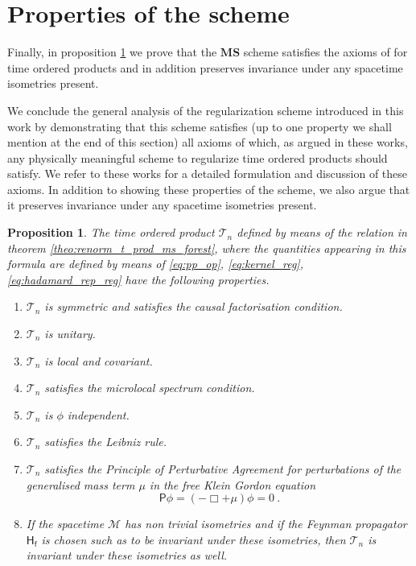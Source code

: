\documentclass[11pt]{book}
\newcommand{\com}[1]{{\color{red}\bf #1}}
\newcommand{\MS}{\textbf{MS}}
\newcommand{\Mcal}{\mathcal{M}}
\newcommand{\Tcal}{\mathcal{T}}
\newcommand{\Hsf}{\mathsf{H}}
\newcommand{\Psf}{\mathsf{P}}
\newcommand{\fsf}{\mathsf{f}}
\theoremstyle{break}
\newtheorem{proposition}{Proposition}[chapter]
\begin{document}
\com{
\section{Properties of the scheme}

Finally, in proposition \ref{prop:properties_scheme} we prove that the $\MS$ scheme satisfies the axioms of \cite{hollands_local_2001,hollands_existence_2002} for time ordered products and in addition preserves invariance under any spacetime isometries present.

We conclude the general analysis of the regularization scheme introduced in this work by demonstrating that this scheme satisfies (up to one property we shall mention at the end of this section) all axioms of \cite{hollands_local_2001,hollands_existence_2002,hollands_conservation_2005} which, as argued in these works, any physically meaningful scheme to regularize time ordered products should satisfy. We refer to these works for a detailed formulation and discussion of these axioms. In addition to showing these properties of the scheme, we also argue that it preserves invariance under any spacetime isometries present.


\begin{proposition}\label{prop:properties_scheme} 
The time ordered product $\Tcal_n$ defined by means of the relation in theorem \ref{theo:renorm_t_prod_ms_forest}, where the quantities appearing in this formula are defined by means of \eqref{eq:pp_op}, \eqref{eq:kernel_reg}, \eqref{eq:hadamard_rep_reg} have the following properties.
%
\begin{enumerate}
%
\item $\Tcal_n$ is symmetric and satisfies the causal factorisation condition.
%
\item $\Tcal_n$ is unitary.
%
\item $\Tcal_n$ is local and covariant.
%
\item $\Tcal_n$ satisfies the microlocal spectrum condition.
%
\item $\Tcal_n$ is $\phi$ independent.
%
\item $\Tcal_n$ satisfies the Leibniz rule.
%
\item $\Tcal_n$ satisfies the Principle of Perturbative Agreement for perturbations of the generalised mass term $\mu$ in the free Klein Gordon equation
%
\begin{equation*}
\Psf \phi = \left( - \Box + \mu \right) \phi = 0 \ . 
\end{equation*}
%
\item If the spacetime $\Mcal$ has non trivial isometries and if the Feynman propagator $\Hsf_\fsf$ is chosen such as to be invariant under these isometries, then $\Tcal_n$ is invariant under these isometries as well.
%
\end{enumerate}
%
\end{proposition}

}
\end{document}
